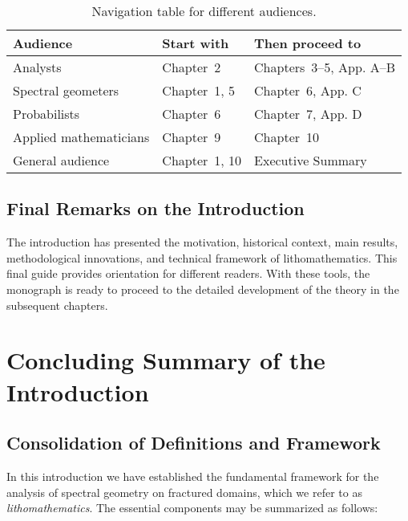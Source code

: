 \begin{table}[h]
\centering
\begin{tabular}{|l|l|l|}
\hline
\textbf{Audience} & \textbf{Start with} & \textbf{Then proceed to} \\
\hline
Analysts & Chapter~2 & Chapters~3–5, App. A–B \\
Spectral geometers & Chapter~1, 5 & Chapter~6, App. C \\
Probabilists & Chapter~6 & Chapter~7, App. D \\
Applied mathematicians & Chapter~9 & Chapter~10 \\
General audience & Chapter~1, 10 & Executive Summary \\
\hline
\end{tabular}
\caption{Navigation table for different audiences.}
\end{table}

\subsection{Final Remarks on the Introduction}

The introduction has presented the motivation, historical context, main results,
methodological innovations, and technical framework of lithomathematics. This
final guide provides orientation for different readers. With these tools, the
monograph is ready to proceed to the detailed development of the theory in the
subsequent chapters.

\section{Concluding Summary of the Introduction}

\subsection{Consolidation of Definitions and Framework}
In this introduction we have established the fundamental framework for the
analysis of spectral geometry on fractured domains, which we refer to as
\emph{lithomathematics}. The essential components may be summarized as follows:

